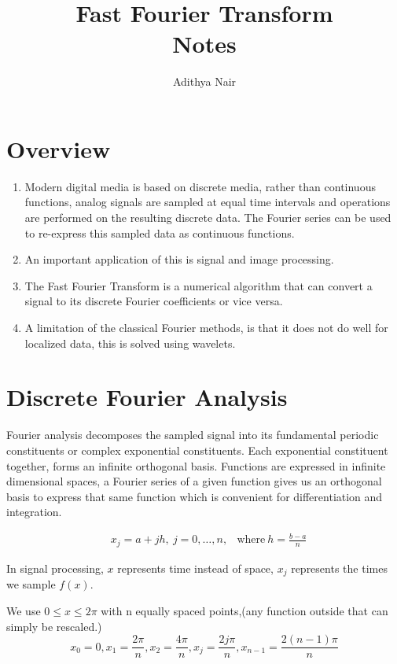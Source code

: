 \documentclass[twoside]{article}
\title{\Huge{Fast Fourier Transform}\\ Notes}
\author{\huge{Adithya Nair}}
\date{}
\begin{document}
\maketitle
\newpage%
\section{Overview}
\begin{enumerate}
	\item Modern digital media is based on discrete media, rather than continuous functions, analog signals are sampled at equal time intervals and operations are performed on the resulting discrete data. The Fourier series can be used to re-express this sampled data as continuous functions.
	\item An important application of this is signal and image processing.
	\item The Fast Fourier Transform is a numerical algorithm that can convert a signal to its discrete Fourier coefficients or vice versa.
	\item A limitation of the classical Fourier methods, is that it does not do well for localized data, this is solved using wavelets.
\end{enumerate}
\section{Discrete Fourier Analysis}
Fourier analysis decomposes the sampled signal into its fundamental periodic constituents or complex exponential constituents. Each exponential constituent together, forms an infinite orthogonal basis. Functions are expressed in infinite dimensional spaces, a Fourier series of a given function gives us an orthogonal basis to express that same function which is convenient for differentiation and integration.

\begin{align*}
	&x_j = a + jh, \ j = 0, \dots, n, & \text{where} \ h = \frac{b-a}{n}
\end{align*}

In signal processing, $x$ represents time instead of space, $x_j$ represents the times we sample $f(x)$.

We use $0 \leq x \leq 2 \pi$ with n equally spaced points,(any function outside that can simply be rescaled.)
\[ 
	x_0 = 0, x_1 = \frac{2\pi}{n}, x_2 = \frac{4\pi}{n}, x_j = \frac{2j\pi}{n}, x_{n-1} = \frac{2(n-1)\pi}{n}
\]
\end{document}
